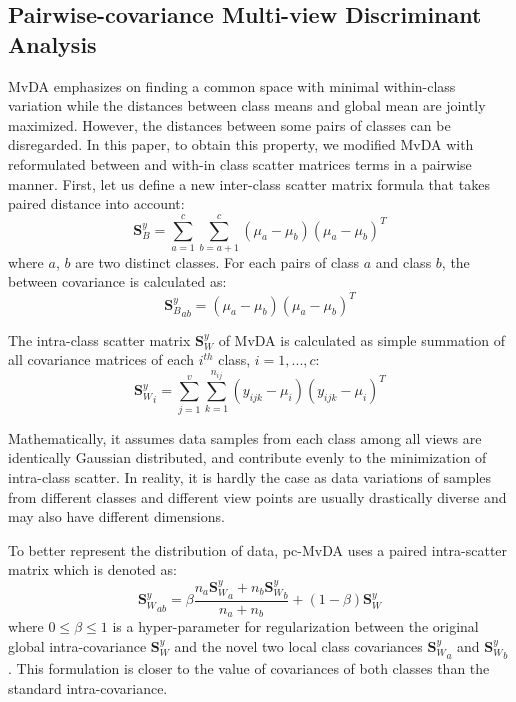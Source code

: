 
\subsection{Pairwise-covariance Multi-view Discriminant Analysis}
    MvDA emphasizes on finding a common space with minimal within-class variation while the distances between class means and global mean are jointly maximized. However, the distances between some pairs of classes can be disregarded. In this paper, to obtain this property, we modified MvDA with reformulated between and with-in class scatter matrices terms in a pairwise manner. First, let us define a new inter-class scatter matrix formula that takes paired distance into account:
    \begin{equation}
        \boldsymbol{S}_B^y=\sum_{a=1}^{c}\sum_{b=a+1}^{c}{\left(\mu_a-\mu_b\right)\left(\mu_a-\mu_b\right)^T}
    \end{equation}
    where $a$, $b$ are two distinct classes. For each pairs of class $a$ and class $b$, the between covariance is calculated as:
    \begin{equation}
        {\boldsymbol{S}_B^y}_{ab}={\left(\mu_a-\mu_b\right)\left(\mu_a-\mu_b\right)^T}
        \label{eq:Sb_ab}
    \end{equation}

    The intra-class scatter matrix $\boldsymbol{S}_W^y$ of MvDA is calculated as simple summation of all covariance matrices of each $i^{th}$ class, $i = {1,...,c}$:
    \begin{equation}
        {\boldsymbol{S}_W^y}_i=\sum_{j=1}^{v}\sum_{k=1}^{n_{ij}}{\left(y_{ijk}-\mu_i\right)\left(y_{ijk}-\mu_i\right)^T}
    \end{equation}

    Mathematically, it assumes data samples from each class among all views are identically Gaussian distributed, and contribute evenly to the minimization of intra-class scatter. In reality, it is hardly the case as data variations of samples from different classes and different view points are usually drastically diverse and may also have different dimensions.

    To better represent the distribution of data, pc-MvDA uses a paired intra-scatter matrix which is denoted as:
    \begin{equation}
        {\boldsymbol{S}_W^y}_{ab}=\beta\frac{n_a{\boldsymbol{S}_W^y}_a+n_b{\boldsymbol{S}_W^y}_b}{n_a+n_b}+\left(1-\beta\right){\boldsymbol{S}_W^y}
        \label{eq:Sw_ab}
    \end{equation}
    where $0\le\beta\le1$ is a hyper-parameter for regularization between the original global intra-covariance ${\boldsymbol{S}_W^y}$ and the novel two local class covariances ${\boldsymbol{S}_W^y}_a$ and ${\boldsymbol{S}_W^y}_b$. This formulation is closer to the value of covariances of both classes than the standard intra-covariance.

